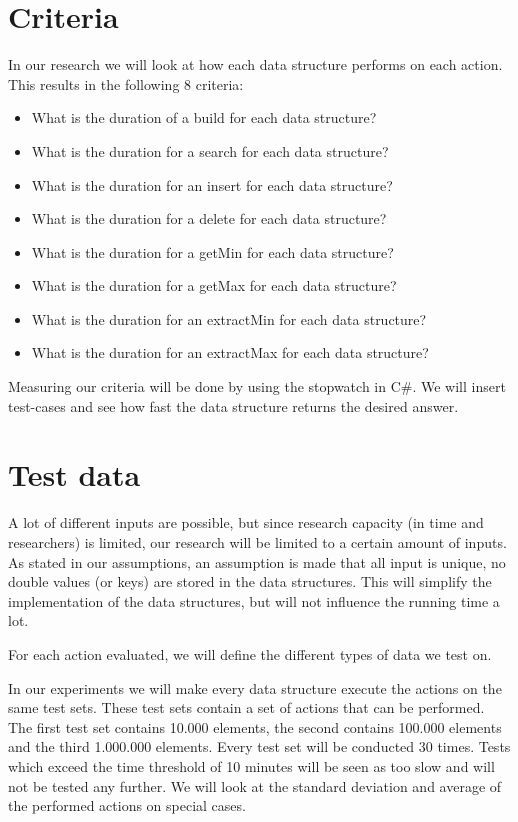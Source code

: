 \documentclass{article}
\begin{document}
\section{Criteria}
In our research we will look at how each data structure performs on each action. This results in the following 8 criteria:
\begin{itemize}
\item What is the duration of a build for each data structure? 
\item What is the duration for a search for each data structure?
\item What is the duration for an insert for each data structure?
\item What is the duration for a delete for each data structure?
\item What is the duration for a getMin for each data structure?
\item What is the duration for a getMax for each data structure? 
\item What is the duration for an extractMin for each data structure?
\item What is the duration for an extractMax for each data structure?
\end{itemize}

Measuring our criteria will be done by using the stopwatch in C\#. We will insert test-cases and see how fast the data structure returns the desired answer.

\section{Test data}
A lot of different inputs are possible, but since research capacity (in time and researchers) is limited, our research will be limited to a certain amount of inputs.
As stated in our assumptions, an assumption is made that all input is unique, no double values (or keys) are stored in the data structures. This will simplify the implementation of the data structures, but will not influence the running time a lot.

For each action evaluated, we will define the different types of data we test on.


In our experiments we will make every data structure execute the actions on the same test sets. These test sets contain a set of actions that can be performed. The first test set contains 10.000 elements, the second contains 100.000 elements and the third 1.000.000 elements. Every test set will be conducted 30 times. Tests which exceed the time threshold of 10 minutes will be seen as too slow and will not be tested any further. We will look at the standard deviation and average of the performed actions on special cases.
\end{document}
